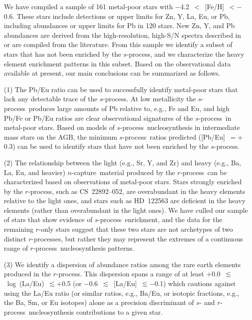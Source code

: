 \documentclass{emulateapj}
\def\rpro{\mbox{$r$-process}}
\def\spro{\mbox{$s$-process}}
\def\ncap{\mbox{$n$-capture}}
\begin{document}
We have compiled a sample of 161 metal-poor stars with 
$-$4.2~$<$~[Fe/H]~$< -$0.6.
These stars include detections or upper limits for
Zn, Y, La, Eu, or Pb, including 
abundances or upper limits for Pb in 120 stars.
New Zn, Y, and Pb
abundances are derived from the high-resolution, high-S/N
spectra described in \citet{simmerer04}
or are compiled from the literature.
From this sample we identify a subset of stars
that has not been enriched by the \spro,
and we characterize the heavy element enrichment patterns in this subset.
Based on the observational data available at present, 
our main conclusions can be summarized as follows.

(1) 
The Pb/Eu ratio 
can be used to successfully identify metal-poor
stars that lack any detectable trace of the \spro.
At low metallicity the \spro\ produces large amounts of 
Pb relative to, e.g., Fe and Eu, and high Pb/Fe or Pb/Eu ratios
are clear observational signatures of the \spro\ in metal-poor stars.
Based on models of \spro\ nucleosynthesis in intermediate mass
stars on the AGB, the minimum \spro\ ratios predicted 
([Pb/Eu]~$= +$0.3)
can be used to identify stars that have not been enriched
by the \spro.

(2)
The relationship between the light (e.g., Sr, Y, and Zr) and heavy
(e.g., Ba, La, Eu, and heavier) \ncap\ material produced by the 
\rpro\ can be characterized based on observations of metal-poor stars.
Stars strongly enriched by the \rpro, such as \mbox{CS~22892--052},
are overabundant in the heavy elements relative to the light ones, and 
stars such as \mbox{HD~122563} are deficient in the heavy elements
(rather than overabundant in the light ones).
We have culled our sample of stars that show evidence of \spro\ 
enrichment, and the data for the remaining $r$-only stars suggest
that these two stars are not archetypes of two distinct $r$-processes, but
rather they may represent the extremes of a continuous range of
\rpro\ nucleosynthesis patterns.

(3)
We identify a dispersion of abundance ratios among the 
rare earth elements produced in the \rpro.
This dispersion spans a range of at least 
$+$0.0~$\lesssim$~log~(La/Eu)~$\lesssim +$0.5
(or $-$0.6~$\lesssim$~[La/Eu]~$\lesssim -$0.1)
which cautions
against using the La/Eu ratio (or similar ratios, e.g., Ba/Eu, or
isotopic fractions, e.g., the Ba, Sm, or Eu isotopes)
alone as a precision discriminant of 
$s$- and \rpro\ nucleosynthesis contributions to a given star.
\end{document}
